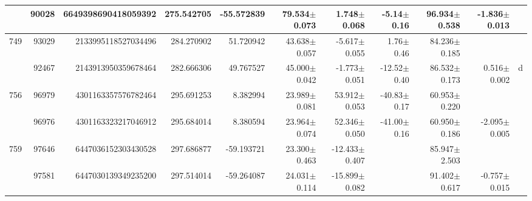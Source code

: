 \documentclass{ws-ijmpd}
\begin{document}
\begin{landscape}
\begin{longtable}{rrrrrrrrrrl}
            &   90028 &      6649398690418059392 &                   275.542705 &                   -55.572839 &                 79.534$\pm$0.073 &                  1.748$\pm$0.068 &          -5.14$\pm$  0.16 &        96.934$\pm$0.538 &                          -1.836$\pm$0.013 &                                                    \\
 \hline 749 &   93029 &      2133995118527034496 &                   284.270902 &                    51.720942 &                 43.638$\pm$0.057 &                 -5.617$\pm$0.055 &           1.76$\pm$  0.46 &        84.236$\pm$0.185 &                                           &                                                    \\
            &   92467 &      2143913950359678464 &                   282.666306 &                    49.767527 &                 45.000$\pm$0.042 &                 -1.773$\pm$0.051 &         -12.52$\pm$  0.40 &        86.532$\pm$0.173 &                           0.516$\pm$0.002 &                                                  d \\
 \hline 756 &   96979 &      4301163357576782464 &                   295.691253 &                     8.382994 &                 23.989$\pm$0.081 &                 53.912$\pm$0.053 &         -40.83$\pm$  0.17 &        60.953$\pm$0.220 &                                           &                                                    \\
            &   96976 &      4301163323217046912 &                   295.684014 &                     8.380594 &                 23.964$\pm$0.074 &                 52.346$\pm$0.050 &         -41.00$\pm$  0.16 &        60.950$\pm$0.186 &                          -2.095$\pm$0.005 &                                                    \\
 \hline 759 &   97646 &      6447036152303430528 &                   297.686877 &                   -59.193721 &                 23.300$\pm$0.463 &                -12.433$\pm$0.407 &                           &        85.947$\pm$2.503 &                                           &                                                    \\
            &   97581 &      6447030139349235200 &                   297.514014 &                   -59.264087 &                 24.031$\pm$0.114 &                -15.899$\pm$0.082 &                           &        91.402$\pm$0.617 &                          -0.757$\pm$0.015 &                                                    \\

\end{longtable}
\end{landscape}
\end{document}
